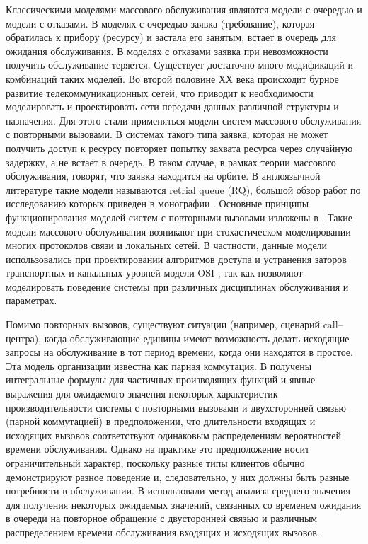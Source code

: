 Классическими моделями массового обслуживания являются модели с очередью и модели с отказами. В моделях с очередью заявка (требование), которая обратилась к прибору (ресурсу) и застала его занятым, встает в очередь для ожидания обслуживания. В моделях с отказами заявка при невозможности получить обслуживание теряется. Существует достаточно много модификаций и комбинаций таких моделей. 
Во второй половине ХХ века происходит бурное развитие телекоммуникационных сетей, что приводит к необходимости моделировать и проектировать сети передачи данных различной структуры и назначения. Для этого стали применяться модели систем массового обслуживания с повторными вызовами. В системах такого типа заявка, которая не может получить доступ к ресурсу повторяет попытку захвата ресурса через случайную задержку, а не встает в очередь. В таком случае, в рамках теории массового обслуживания, говорят, что заявка находится на орбите. В англоязычной литературе такие модели называются retrial queue (RQ), большой обзор работ по исследованию которых приведен в монографии \cite{artalejo2010accessible}. Основные принципы функционирования моделей систем с повторными вызовами изложены в \cite{jesus2008retrial,falin1997retrial}. Такие модели массового обслуживания возникают при стохастическом моделировании многих протоколов связи и локальных сетей. В частности, данные модели использовались при проектировании алгоритмов доступа и устранения заторов транспортных и канальных уровней модели OSI \cite{bjornstad2006traffic,kritzinger1986performance,olypher2010computer}, так как позволяют моделировать поведение системы при различных дисциплинах обслуживания и параметрах.

Помимо повторных вызовов, существуют ситуации (например, сценарий call--центра), когда обслуживающие единицы имеют возможность делать исходящие запросы на обслуживание в тот период времени, когда они находятся в простое. Эта модель организации известна как парная коммутация. В \cite{falin1979model} получены интегральные формулы для частичных производящих функций и явные выражения для ожидаемого значения некоторых характеристик производительности системы с повторными вызовами и двухсторонней связью (парной коммутацией) в предположении, что длительности входящих и исходящих вызовов соответствуют одинаковым распределениям вероятностей времени обслуживания. Однако на практике это предположение носит ограничительный характер, поскольку разные типы клиентов обычно демонстрируют разное поведение и, следовательно, у них должны быть разные потребности в обслуживании. В \cite{artalejo2010mean} использовали метод анализа среднего значения для получения некоторых ожидаемых значений, связанных со временем ожидания в очереди на повторное обращение с двусторонней связью и различным распределением времени обслуживания входящих и исходящих вызовов.

